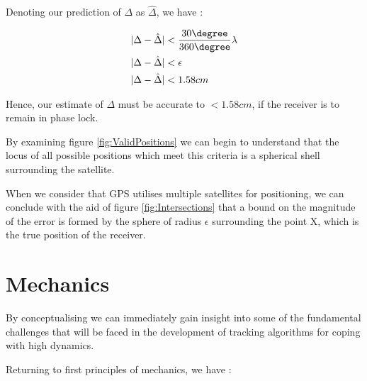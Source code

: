 Denoting our prediction of $\Delta$ as $\hat{\Delta}$, we have :

\begin{align}
|\Delta-\hat{\Delta}|& < \frac{30\degree}{360\degree} \lambda\\
|\Delta-\hat{\Delta}|&<\epsilon\\
|\Delta-\hat{\Delta}|&<1.58cm\\
\label{eq:RangeErrorBound}
\end{align}

Hence, our estimate of $\Delta$ must be accurate to $< 1.58cm$, if the receiver is to remain in phase lock.

By examining figure \ref{fig:ValidPositions} we can begin to understand that the locus of all possible positions which meet this criteria is a spherical shell surrounding the satellite. 

When we consider that GPS utilises multiple satellites for positioning, we can conclude with the aid of figure \ref{fig:Intersections} that a bound on the magnitude of the error is formed by the sphere of radius $\epsilon$ surrounding the point X, which is the true position of the receiver. 

\begin{comment}

Hence, we have :

\begin{align}
| X(t)-\hat{X}(t) | & < \frac{30\degree}{360\degree} \lambda \\
| X(t)-\hat{X}(t) | &<\Delta\\
| X(t)-\hat{X}(t) | & < 1.58cm
\label{eq:PositionErrorBound}
\end{align}
\end{comment}

\section{Mechanics}

By conceptualising we can immediately gain insight into some of the fundamental challenges that will be faced in the development of tracking algorithms for coping with high dynamics.








Returning to first principles of mechanics, we have \cite{salas1999etgen} : 

